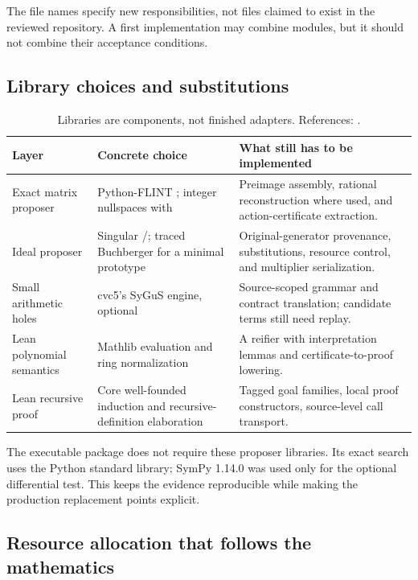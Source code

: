 The file names specify new responsibilities, not files claimed to exist in the
reviewed repository. A first implementation may combine modules, but it should
not combine their acceptance conditions.

\subsection{Library choices and substitutions}

\begin{table}[ht]
\small
\begin{tabularx}{\textwidth}{@{}p{}YY@{}}
\toprule
Layer & Concrete choice & What still has to be implemented \\
\midrule
Exact matrix proposer & Python-FLINT ; integer nullspaces with  & Preimage assembly, rational reconstruction where used, and action-certificate extraction. \\
Ideal proposer & Singular /; traced Buchberger for a minimal prototype & Original-generator provenance, substitutions, resource control, and multiplier serialization. \\
Small arithmetic holes & cvc5's SyGuS engine, optional & Source-scoped grammar and contract translation; candidate terms still need replay. \\
Lean polynomial semantics & Mathlib  evaluation and ring normalization & A reifier with interpretation lemmas and certificate-to-proof lowering. \\
Lean recursive proof & Core well-founded induction and recursive-definition elaboration & Tagged goal families, local proof constructors, source-level call transport. \\
\bottomrule
\end{tabularx}
\caption{Libraries are components, not finished adapters. References: \cite{flint-q,flint-z,singular,cvc5,mathlib-eval,lean-recursion}.}
\end{table}

The executable package does not require these proposer libraries. Its exact
search uses the Python standard library; SymPy 1.14.0 was used only for the
optional differential test. This keeps the evidence reproducible while making
the production replacement points explicit.

\subsection{Resource allocation that follows the mathematics}

